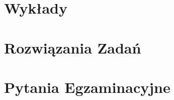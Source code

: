 \documentclass[12pt, a4paper, polish, openany]{book}
\begin{document}
\frontmatter



\tableofcontents


\mainmatter

\chapter{Wykłady}


\chapter{Rozwiązania Zadań}


\chapter{Pytania Egzaminacyjne}

\end{document}
